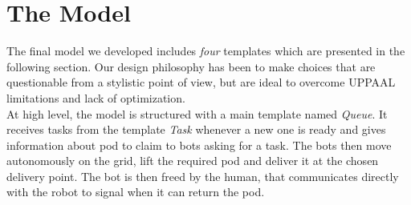 \documentclass{article}
\begin{document}
	\tableofcontents
	\clearpage
	
	\section{The Model}
		The final model we developed includes \emph{four} templates which are presented in the following section. Our design philosophy has been to make choices that are questionable from a stylistic point of view, but are ideal to overcome UPPAAL limitations and lack of optimization.\\
		At high level, the model is structured with a main template named \emph{Queue}. It receives tasks from the template \emph{Task} whenever a new one is ready and gives information about pod to claim to bots asking for a task. The bots then move autonomously on the grid, lift the required pod and deliver it at the chosen delivery point. The bot is then freed by the human, that communicates directly with the robot to signal when it can return the pod. 
\end{document}
